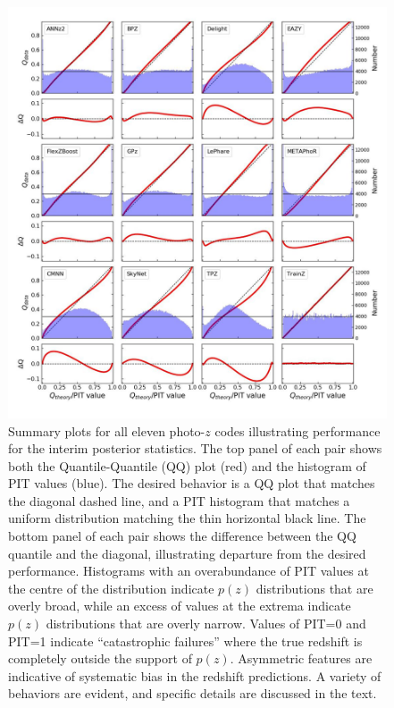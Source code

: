 \documentclass[usenatbib]{mn2e}
\newcommand{\red}[1]{\textcolor{red}{#1}}
\newcommand{\aim}[1]{\textcolor{green}{#1}}%
\begin{document}

\begin{figure}
\centering
\includegraphics[width=\textwidth]{figures/PITANDQQplot_12codes_crop.jpg}
\caption{Summary plots for all eleven photo-$z$ codes illustrating performance for the interim posterior statistics. The top panel of each pair shows both the Quantile-Quantile (QQ) plot (red) and the histogram of PIT values (blue).  The desired behavior is a QQ plot that matches the diagonal dashed line, and a PIT histogram that matches a uniform distribution matching the thin horizontal black line.  The bottom panel of each pair shows the difference between the QQ quantile and the diagonal, illustrating departure from the desired performance.  Histograms with an overabundance of PIT values at the centre of the distribution indicate $p(z)$ distributions that are overly broad, while an excess of values at the extrema indicate $p(z)$ distributions that are overly narrow.  Values of PIT=0 and PIT=1 indicate ``catastrophic failures'' where the true redshift is completely outside the support of $p(z)$.  Asymmetric features are indicative of systematic bias in the redshift predictions.  A variety of behaviors are evident, and specific details are discussed in the text.}
\label{fig:pitqq}
\end{figure}
\end{document}
